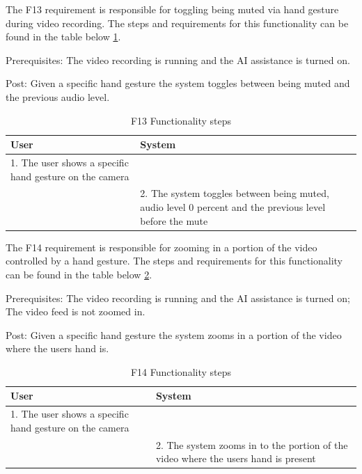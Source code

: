 \par The F13 requirement is responsible for toggling being muted via hand gesture during video recording. The steps and requirements for this functionality can be found in the table below \ref{F13Table}.
\par Prerequisites: The video recording is running and the AI assistance is turned on.
\par Post: Given a specific hand gesture the system toggles between being muted and the previous audio level.

\begin{table}[htbp]
\begin{center}
\begin{tabular}
{|p{180pt}|p{180pt}|}
\hline
 User & System\\
\hline 
\hline 1. The user shows a specific hand gesture on the camera &  \\
\hline  & 2. The system toggles between being muted, audio level 0 percent and the previous level before the mute \\
\hline
\end{tabular}
\end{center}
\caption{F13 Functionality steps}
\label{F13Table}
\end{table}

\par The F14 requirement is responsible for zooming in a portion of the video controlled by a hand gesture. The steps and requirements for this functionality can be found in the table below \ref{F14Table}.
\par Prerequisites: The video recording is running and the AI assistance is turned on; The video feed is not zoomed in.
\par Post: Given a specific hand gesture the system zooms in a portion of the video where the users hand is.

\begin{table}[htbp]
\begin{center}
\begin{tabular}
{|p{180pt}|p{180pt}|}
\hline
 User & System\\
\hline 
\hline 1. The user shows a specific hand gesture on the camera &  \\
\hline  & 2. The system zooms in to the portion of the video where the users hand is present \\
\hline
\end{tabular}
\end{center}
\caption{F14 Functionality steps}
\label{F14Table}
\end{table}

